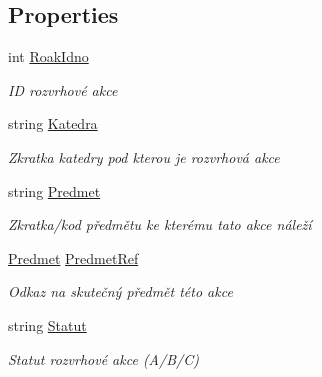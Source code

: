 \subsection*{Properties}
\begin{DoxyCompactItemize}
\item 
int \hyperlink{class_analyza_rozvrhu_1_1_s_t_a_g___classes_1_1_rozvrhova_akce_ace6a17c6ca5e27be63fe3827f2eed317}{Roak\+Idno}
\begin{DoxyCompactList}\small\item\em ID rozvrhové akce \end{DoxyCompactList}\item 
string \hyperlink{class_analyza_rozvrhu_1_1_s_t_a_g___classes_1_1_rozvrhova_akce_af5bc412d63511f911971930749c9fca8}{Katedra}
\begin{DoxyCompactList}\small\item\em Zkratka katedry pod kterou je rozvrhová akce \end{DoxyCompactList}\item 
string \hyperlink{class_analyza_rozvrhu_1_1_s_t_a_g___classes_1_1_rozvrhova_akce_ac7a97b16bd4e6e4d00a1876db05f2c49}{Predmet}
\begin{DoxyCompactList}\small\item\em Zkratka/kod předmětu ke kterému tato akce náleží \end{DoxyCompactList}\item 
\hyperlink{class_analyza_rozvrhu_1_1_s_t_a_g___classes_1_1_predmet}{Predmet} \hyperlink{class_analyza_rozvrhu_1_1_s_t_a_g___classes_1_1_rozvrhova_akce_ab5ed7ff39752877a21747105799c225c}{Predmet\+Ref}
\begin{DoxyCompactList}\small\item\em Odkaz na skutečný předmět této akce \end{DoxyCompactList}\item 
string \hyperlink{class_analyza_rozvrhu_1_1_s_t_a_g___classes_1_1_rozvrhova_akce_ada5415c401ddca0def6a1364eda9bef8}{Statut}
\begin{DoxyCompactList}\small\item\em Statut rozvrhové akce (A/\+B/C) \end{DoxyCompactList}\item 

\end{DoxyCompactItemize}
